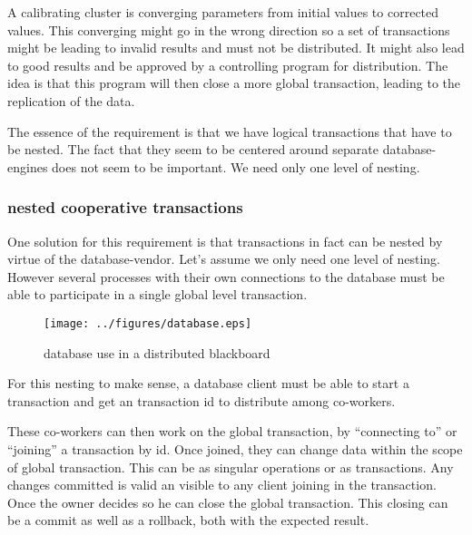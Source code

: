 \documentclass[]{lofar}
\begin{document}
      A calibrating cluster is converging parameters from initial
      values to corrected values. This converging might go in the
      wrong direction so a set of transactions might be leading to
      invalid results and must not be distributed. It might also lead
      to good results and be approved by a controlling program for
      distribution. The idea is that this program will then close a
      more global transaction, leading to the replication of the data.

      The essence of the requirement is that we have logical
      transactions that have to be nested. The fact that they seem to
      be centered around separate database-engines does not seem to be
      important. We need only one level of nesting.

      \subsubsection{nested cooperative transactions}
      \label{subsubsec:nested-cooperative-transaction}\hypertarget{subsubsec:nested-cooperative-transaction}{}

        One solution for this requirement is that transactions in fact
        can be nested by virtue of the database-vendor. Let's assume
        we only need one level of nesting. However several processes
        with their own connections to the database must be able to
        participate in a single global level transaction.

        \begin{figure}
          \texttt{[image: ../figures/database.eps]}
          \hypertarget{fig:database}{}
          \caption{database use in a distributed blackboard\label{fig:database}}
        \end{figure}

        For this nesting to make sense, a database client must be able
        to start a transaction and get an transaction id to distribute
        among co-workers.

        These co-workers can then work on the global transaction, by
        ``connecting to'' or ``joining'' a transaction by id. Once joined,
        they can change data within the scope of global
        transaction. This can be as singular operations or as
        transactions. Any changes committed is valid an visible to any
        client joining in the transaction. Once the owner decides so
        he can close the global transaction. This closing can be a
        commit as well as a rollback, both with the expected result.
     
\end{document}
